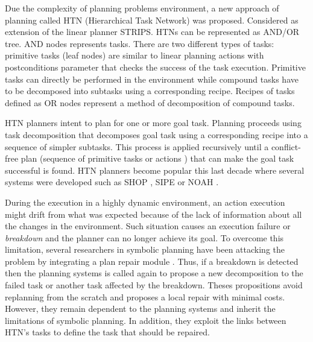 \documentclass[conference]{IEEEtran}
\begin{document}
	Due the complexity of planning problems environment, a new approach of planning called  HTN (Hierarchical Task Network)  \cite{erol1996hierarchical} was proposed. Considered as extension of the linear planner STRIPS. HTNs can be represented as AND/OR tree. AND nodes represents tasks. There are two different types of tasks: primitive tasks (leaf nodes) are similar to linear planning actions with postconditions parameter that checks the success of the task execution. Primitive tasks can directly be performed in the environment while compound tasks have to be decomposed into subtasks using a corresponding recipe.    Recipes of tasks defined as OR nodes represent a method of decomposition of compound tasks. 
	\par  HTN planners intent to plan for one or more goal task. Planning proceeds using task decomposition that decomposes goal task  using a corresponding recipe into a sequence of simpler subtasks. This process is applied recursively until a conflict-free plan (sequence of primitive tasks or actions ) that can make the goal task successful is found. 
	HTN planners become popular this last decade  where several systems were developed such as SHOP \cite{nau1999shop}, SIPE \cite{wilkins1988practical} or NOAH  \cite{sacerdoti1975structure}. 
	\par During the execution in a highly dynamic environment, an action execution might drift from what was expected because of the lack of information about all the changes in the environment. Such situation causes an execution failure or \emph{breakdown} and the planner can no longer achieve its goal. 
		To overcome this limitation, several researchers in symbolic planning have been attacking the problem by integrating a plan repair module \cite{boella2002replanning, van2005plan,hayashi2006dynagent,ayan2007hotride,warfield2007adaptation}. Thus, if a breakdown is detected then the planning systems is called again to propose a new decomposition to the failed task or another task affected by the breakdown. Theses propositions avoid replanning from the scratch and proposes a local repair with minimal costs. However, they remain dependent to the planning systems and  inherit the limitations of symbolic planning. In addition, they exploit the links between HTN's tasks to define the task that should be repaired.
	
\end{document}
